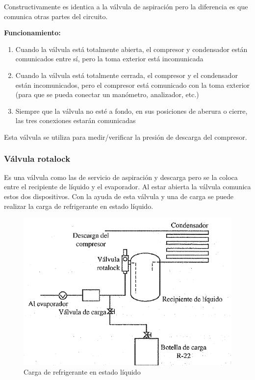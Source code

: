 Constructivamente es identica a la v\'alvula de aspiraci\'on pero la diferencia es que comunica otras partes del circuito.

\textbf{Funcionamiento:}

\begin{enumerate}[1.]
    \item Cuando la v\'alvula est\'a totalmente abierta, el compresor y condensador est\'an comunicados entre s\'i, pero la toma exterior est\'a incomunicada
    \item Cuando la v\'alvula est\'a totalmente cerrada, el compresor y el condensador est\'an incomunicados, pero el compresor est\'a comunicado con la toma exterior (para que se pueda conectar un man\'ometro, analizador, etc.)
    \item Siempre que la v\'alvula no est\'e a fondo, en sus posiciones de aberura o cierre, las tres conexiones estar\'an comunicadas
\end{enumerate}

Esta v\'alvula se utiliza para medir/verificar la presi\'on de descarga del compresor.

\subsubsection{V\'alvula rotalock}

Es una v\'alvula como las de servicio de aspiraci\'on y descarga pero se la coloca entre el recipiente de l\'iquido y el evaporador. Al estar abierta la v\'alvula comunica estos dos dispositivos. Con la ayuda de esta v\'alvula y una de carga se puede realizar la carga de refrigerante en estado l\'iquido.

\begin{figure}[htbp]
    \centering
    \includegraphics[width=.6\linewidth]{figuras/control-seguridad/carga-fluido-liquido.png}
    \caption{Carga de refrigerante en estado l\'iquido}
    \label{fig:carga-fluido-liquido}
\end{figure}

